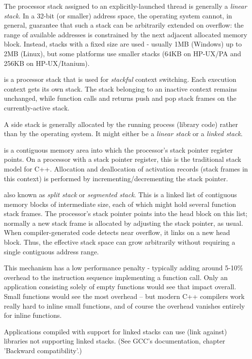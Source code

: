 The processor stack assigned to an explicitly-launched thread is generally
a \emph{linear stack}. In a 32-bit (or smaller) address space, the operating
system cannot, in general, guarantee that such a stack can be arbitrarily
extended on overflow: the range of available addresses is constrained by the
next adjacent allocated memory block. Instead, stacks with a fixed size are
used - usually 1MB (Windows) up to 2MB (Linux), but some platforms use smaller
stacks (64KB on HP-UX/PA and 256KB on HP-UX/Itanium).

is a processor stack that is used for \emph{stackful} context switching. Each
execution context gets its own stack. The stack belonging to an inactive
context remains unchanged, while function calls and returns push and pop stack
frames on the currently-active stack.

A side stack is generally allocated by the running process (library code)
rather than by the operating system. It might either be a \emph{linear stack}
or a \emph{linked stack}.

is a contiguous memory area into which the processor's stack pointer register
points. On a processor with a stack pointer register, this is the traditional
stack model for C++. Allocation and deallocation of activation records
(stack frames in this context) is performed by incrementing/decrementing the
stack pointer.

also known as \emph{split stack}\cite{gccsplit} or \emph{segmented
stack}\cite{llvmseg}. This is a linked list of contiguous memory blocks of
intermediate size, each of which might hold several function stack frames. The
processor's stack pointer points into the head block on this list; normally a
new stack frame is allocated by adjusting the stack pointer, as usual. When
compiler-generated code detects near overflow, it links on a new head block.
Thus, the effective stack space can grow arbitrarily without requiring a
single contiguous address range.

This mechanism has a low performance penalty - typically adding around 5-10\%
overhead to the instruction sequence implementing a function call. Only an
application consisting solely of empty functions would see that impact
overall. Small functions would see the most overhead -- but modern C++
compilers work really hard to inline small functions, and of course the
overhead vanishes entirely for inline functions.

Applications compiled with support for linked stacks can use (link against)
libraries not supporting linked stacks. (See GCC's documentation\cite{gccsplit},
chapter 'Backward compatibility'.)

